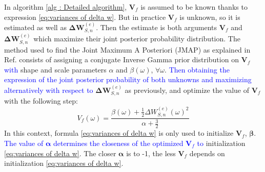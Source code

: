 \documentclass[aps,prb,superscriptaddress,preprint]{revtex4-1}
\begin{document}
	In algorithm \ref{alg : Detailed algorithm}, $\mathbf{V}_{f}$ is assumed to be known thanks to expression \eqref{eq:variances of delta w}.
	 But in practice $\mathbf{V}_{f}$ is unknown, so it is estimated as well as $\mathbf{\Delta W}^{(e)}_{S,n}$. Then the estimate is both arguments $\mathbf{V}_{f}$ and $\mathbf{\Delta W}^{(e)}_{S,n}$ which maximize their joint posterior probability distribution. The method used to find the Joint Maximum A Posteriori (JMAP) as explained in Ref.  consists of assigning a conjugate Inverse Gamma prior distribution on $\mathbf{V}_{f}$ \textcolor{blue}{with} shape and scale parameters  $\alpha$ and $\beta(\omega)$, $\forall \omega$. \textcolor{blue}{Then obtaining the expression of the joint posterior probability of both unknowns and maximizing alternatively with respect to} $\mathbf{\Delta W}^{(e)}_{S,n}$ as previously, and optimize the value of $\mathbf{V}_{f}$ with the following step:
	\begin{equation}
	V_{f}(\omega) = \frac{\beta(\omega)+\frac{1}{2}\Delta W^{(e)}_{S,n}(\omega)^{2}}{\alpha+\frac{3}{2}}
	\end{equation}
	In this context, formula \eqref{eq:variances of delta w} is only used to initialize $\mathbf{V}_{f}$, $\mathbf{\beta}$. \textcolor{blue}{The value of $\mathbf{\alpha}$ determines the closeness of the optimized $\mathbf{V}_{f}$ to} initialization \eqref{eq:variances of delta w}. The closer $\mathbf{\alpha}$ is to -1, the less $\mathbf{V}_{f}$ depends on initialization \eqref{eq:variances of delta w}.
	
\end{document}
